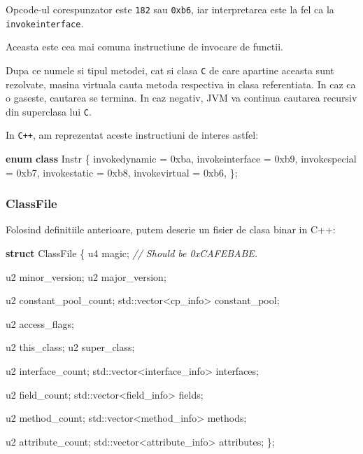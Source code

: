 \documentclass[]{article}
\newenvironment{Shaded}{}{}
\newcommand{\KeywordTok}[1]{\textcolor[rgb]{0.00,0.44,0.13}{\textbf{#1}}}
\newcommand{\BaseNTok}[1]{\textcolor[rgb]{0.25,0.63,0.44}{#1}}
\newcommand{\CommentTok}[1]{\textcolor[rgb]{0.38,0.63,0.69}{\textit{#1}}}
\newcommand{\BuiltInTok}[1]{#1}
\newcommand{\NormalTok}[1]{#1}
\begin{document}
Opcode-ul corespunzator este \texttt{182} sau \texttt{0xb6}, iar
interpretarea este la fel ca la \texttt{invokeinterface}.

Aceasta este cea mai comuna instructiune de invocare de functii.

Dupa ce numele si tipul metodei, cat si clasa \texttt{C} de care
apartine aceasta sunt rezolvate, masina virtuala cauta metoda respectiva
in clasa referentiata. In caz ca o gaseste, cautarea se termina. In caz
negativ, JVM va continua cautarea recursiv din superclasa lui
\texttt{C}.

In \texttt{C++}, am reprezentat aceste instructiuni de interes astfel:

\begin{Shaded}
\begin{Highlighting}[]
\KeywordTok{enum} \KeywordTok{class}\NormalTok{ Instr \{}
\NormalTok{    invokedynamic = }\BaseNTok{0xba}\NormalTok{,}
\NormalTok{    invokeinterface = }\BaseNTok{0xb9}\NormalTok{,}
\NormalTok{    invokespecial = }\BaseNTok{0xb7}\NormalTok{,}
\NormalTok{    invokestatic = }\BaseNTok{0xb8}\NormalTok{,}
\NormalTok{    invokevirtual = }\BaseNTok{0xb6}\NormalTok{,}
\NormalTok{\};}
\end{Highlighting}
\end{Shaded}

\subsubsection{ClassFile}\label{classfile}

Folosind definitiile anterioare, putem descrie un fisier de clasa binar
in C++:

\begin{Shaded}
\begin{Highlighting}[]
\KeywordTok{struct}\NormalTok{ ClassFile \{}
\NormalTok{    u4 magic; }\CommentTok{// Should be 0xCAFEBABE.}

\NormalTok{    u2 minor_version;}
\NormalTok{    u2 major_version;}

\NormalTok{    u2 constant_pool_count;}
    \BuiltInTok{std::}\NormalTok{vector<cp_info> constant_pool;}

\NormalTok{    u2 access_flags;}

\NormalTok{    u2 this_class;}
\NormalTok{    u2 super_class;}

\NormalTok{    u2 interface_count;}
    \BuiltInTok{std::}\NormalTok{vector<interface_info> interfaces;}

\NormalTok{    u2 field_count;}
    \BuiltInTok{std::}\NormalTok{vector<field_info> fields;}

\NormalTok{    u2 method_count;}
    \BuiltInTok{std::}\NormalTok{vector<method_info> methods;}

\NormalTok{    u2 attribute_count;}
    \BuiltInTok{std::}\NormalTok{vector<attribute_info> attributes;}
\NormalTok{\};}
\end{Highlighting}
\end{Shaded}
\end{document}
